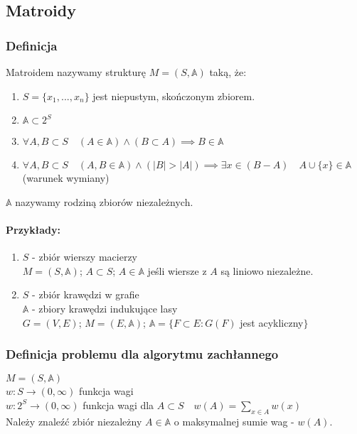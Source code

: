 \subsection{Matroidy}
\subsubsection{Definicja}
Matroidem nazywamy strukturę $M = (S,\mathbb{A})$ taką, że:
\begin{enumerate}
	\item $S = \{x_1, ... , x_n \}$ jest niepustym, skończonym zbiorem.
	\item $\mathbb{A} \subset 2^S$
	\item $\forall{A,B \subset S} \quad (A \in \mathbb{A}) \land (B \subset A) \implies B \in \mathbb{A}$
	\item $\forall{A,B \subset S} \quad (A,B \in \mathbb{A}) \land (|B| > |A|) \implies \exists{x} \in (B - A) \quad A \cup \{x\} \in \mathbb{A} $ (warunek wymiany)
\end{enumerate}
$\mathbb{A}$ nazywamy rodziną zbiorów niezależnych.

\paragraph{Przykłady:} 
\begin{enumerate}
	\item $S$ - zbiór wierszy macierzy \\
	$M = (S,\mathbb{A})$;
	$A \subset S$;
	$A\in\mathbb{A}$ jeśli wiersze z $A$ są liniowo niezależne.

	\item $S$ - zbiór krawędzi w grafie \\
	$\mathbb{A}$ - zbiory krawędzi indukujące lasy \\
	$G = (V,E)$; \quad
	$M = (E,\mathbb{A})$; \quad  
	$\mathbb{A} = \{F \subset E : G(F)$ jest acykliczny$\}$
\end{enumerate}

\subsubsection{Definicja problemu dla algorytmu zachłannego}
$M = (S,\mathbb{A})$\\
$w:S \rightarrow (0,\infty)$ funkcja wagi \\
$w:2^S \rightarrow (0, \infty) $ funkcja wagi dla $A \subset S \quad w(A) = \sum_{x \in A} w(x)$ \\
Należy znaleźć zbiór niezależny $A \in \mathbb{A}$ o maksymalnej sumie wag - $w(A)$.

